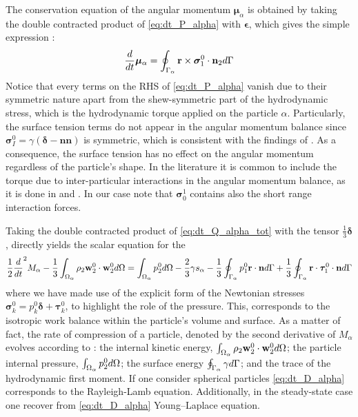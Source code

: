 The conservation equation of the angular momentum $\bm{\mu}_\alpha$ is obtained by taking the double contracted product of \ref{eq:dt_P_alpha} with $\bm\epsilon$, which gives the simple expression :
\begin{equation}
    \frac{d}{dt}\bm{\mu}_\alpha
    =  
    \oint_{\Gamma_\alpha}  \textbf{r} \times \bm{\sigma}_1^0\cdot \textbf{n}_2  d\Gamma
    \label{eq:dt_mu_alpha}
\end{equation}
Notice that every terms on the RHS of \ref{eq:dt_P_alpha} vanish due to their symmetric nature apart from the shew-symmetric part of the hydrodynamic stress, which is the hydrodynamic torque applied on the particle $\alpha$.
Particularly, the surface tension terms do not appear in the angular momentum balance since $\bm\sigma_I^0 = \gamma (\bm\delta-\textbf{nn})$ is symmetric, which is consistent with the findings of \citet{hesla1993note}. 
As a consequence, the surface tension has no effect on the angular momentum regardless of the particle's shape. 
In the literature it is common to include the torque due to inter-particular interactions in the angular momentum balance, as it is done in \citet{jackson1997locally} and \citet{zhang1997momentum}.
In our case note that $\bm{\sigma}_0^1$ contains also the short range interaction forces.

Taking the double contracted product of \ref{eq:dt_Q_alpha_tot} with the tensor $\frac{1}{3}\bm\delta$, directly yields the scalar equation for the 
\begin{equation}
    \frac{1}{2}\frac{d}{dt}^2 {M_\alpha}
    - \frac{1}{3}\int_{\Omega_\alpha}  \rho_2 \textbf{w}_2^0 \cdot \textbf{w}_2^0 d\Omega
    = 
    \int_{\Omega_\alpha} p_2^0 d\Omega 
    - \frac{2}{3} \gamma s_\alpha
    - \frac{1}{3}\oint_{\Gamma_\alpha} p_1^0 \textbf{r}\cdot \textbf{n} d\Gamma
    + \frac{1}{3}\oint_{\Gamma_\alpha} \textbf{r}\cdot\bm\tau_1^0\cdot \textbf{n} d\Gamma
    \label{eq:dt_D_alpha}
\end{equation}
where we have made use of the explicit form of the Newtonian stresses $\bm\sigma_k^0 = p_k^0 \bm\delta + \bm\tau_k^0$, to highlight the role of the pressure. 
This, corresponds to the isotropic work balance within the particle's volume and surface. 
As a matter of fact, the rate of compression of a particle, denoted by the second derivative of $M_\alpha$ evolves according to : 
the internal kinetic energy, $\int_{\Omega_\alpha} \rho_2 \textbf{w}_2^0 \cdot \textbf{w}_2^0  d\Omega$;
the particle internal pressure, $\int_{\Omega_\alpha}  p_2^0 d\Omega$; 
the surface energy $\oint_{\Gamma_\alpha}  \gamma  d\Gamma$; 
and the trace of the hydrodynamic first moment.
If one consider spherical particles \ref{eq:dt_D_alpha} corresponds to the Rayleigh-Lamb equation.  
Additionally, in the steady-state case one recover from \ref{eq:dt_D_alpha} Young–Laplace equation. 



